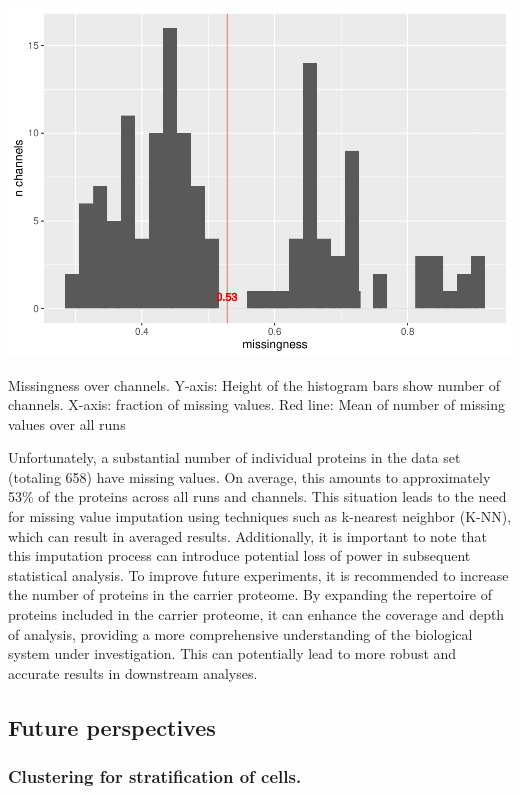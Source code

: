\documentclass[
  11pt,
]{article}
\begin{document}
{\centering \includegraphics[width=0.9\linewidth]{Thesis_files/figure-latex/missingness-1} 

}

\caption{Missingness over channels. Y-axis: Height of the histogram bars show number of channels. X-axis: fraction of missing values. Red line: Mean of number of missing values over all runs}\label{fig:missingness}
 \endfigure\egroup

Unfortunately, a substantial number of individual proteins in the data
set (totaling 658) have missing values. On average, this amounts to
approximately 53\% of the proteins across all runs and channels. This
situation leads to the need for missing value imputation using
techniques such as k-nearest neighbor (K-NN), which can result in
averaged results. Additionally, it is important to note that this
imputation process can introduce potential loss of power in subsequent
statistical analysis. To improve future experiments, it is recommended
to increase the number of proteins in the carrier proteome. By expanding
the repertoire of proteins included in the carrier proteome, it can
enhance the coverage and depth of analysis, providing a more
comprehensive understanding of the biological system under
investigation. This can potentially lead to more robust and accurate
results in downstream analyses.

\hypertarget{future-perspectives}{%
\subsection{Future perspectives}\label{future-perspectives}}

\hypertarget{clustering-for-stratification-of-cells.}{%
\subsubsection{Clustering for stratification of
cells.}\label{clustering-for-stratification-of-cells.}}
\end{document}
